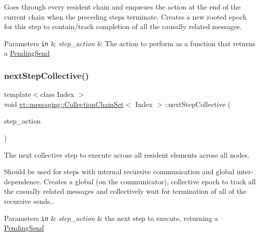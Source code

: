 Goes through every resident chain and enqueues the action at the end of the current chain when the preceding steps terminate. Creates a new rooted epoch for this step to contain/track completion of all the causally related messages.


\begin{DoxyParams}[1]{Parameters}
\mbox{\tt in}  & {\em step\+\_\+action} & The action to perform as a function that returns a {\ttfamily \hyperlink{structvt_1_1messaging_1_1_pending_send}{Pending\+Send}} \\
\hline
\end{DoxyParams}
\mbox{\label{classvt_1_1messaging_1_1_collection_chain_set_a7d226984e696278b9ca7e539c974bab4}} 
\subsubsection{\texorpdfstring{next\+Step\+Collective()}{nextStepCollective()}}
{\footnotesize\ttfamily template$<$class Index $>$ \\
void \hyperlink{classvt_1_1messaging_1_1_collection_chain_set}{vt\+::messaging\+::\+Collection\+Chain\+Set}$<$ Index $>$\+::next\+Step\+Collective (\begin{DoxyParamCaption}\item[{std\+::function$<$ \hyperlink{structvt_1_1messaging_1_1_pending_send}{Pending\+Send}(Index)$>$}]{step\+\_\+action }\end{DoxyParamCaption})\hspace{0.3cm}{\ttfamily [inline]}}



The next collective step to execute across all resident elements across all nodes. 

Should be used for steps with internal recursive communication and global inter-\/dependence. Creates a global (on the communicator), collective epoch to track all the casually related messages and collectively wait for termination of all of the recursive sends..


\begin{DoxyParams}[1]{Parameters}
\mbox{\tt in}  & {\em step\+\_\+action} & the next step to execute, returning a {\ttfamily \hyperlink{structvt_1_1messaging_1_1_pending_send}{Pending\+Send}} \\
\hline
\end{DoxyParams}
\mbox{\label{classvt_1_1messaging_1_1_collection_chain_set_afcb749b22063068d060f35fdcd2320b3}} 
